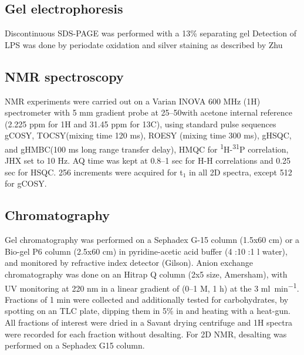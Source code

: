 	\subsection{Gel electrophoresis} %
	\label{sub:gel_electrophoresis}

		Discontinuous \ac{SDS-PAGE} was performed with a 13\% separating gel Detection of \ac{LPS} was done by periodate oxidation and silver staining as described by Zhu \etal{}

	\subsection{\textsc{NMR} spectroscopy} %
	\label{sub:nmr_spectroscopy}

		\ac{NMR} experiments were carried out on a Varian INOVA 600 \si{\mega\hertz} (1H) spectrometer with 5 \si{\milli\meter} gradient probe at 25--50\cel with acetone internal reference (2.225 ppm for 1H and 31.45 ppm for 13C), using standard pulse sequences \ac{gCOSY}, \ac{TOCSY}(mixing time 120 \si{\milli\second}), \ac{ROESY} (mixing time 300 \si{\milli\second}),  \ac{gHSQC}, and  \ac{gHMBC}(100 \si{\milli\second} long range transfer delay), \ac{HMQC} for \textsuperscript{1}H-\textsuperscript{31}P correlation, JHX set to 10 \si{\hertz}. AQ time was kept at 0.8--1 sec for H-H correlations and 0.25 sec for \ac{HSQC}. 256 increments were acquired for t$_1$ in all 2D spectra, except 512 for \ac{gCOSY}.

	\subsection{Chromatography} %
	\label{sub:chromatography}

		Gel chromatography was performed on a Sephadex G-15 column (1.5x60 cm) or a Bio-gel P6 column (2.5x60 cm) in pyridine-acetic acid buffer (4 \millilitre:10 \millilitre:1 \si{\litre} water), and monitored by refractive index detector (Gilson). Anion exchange chromatography was done on an Hitrap Q column (2x5 \millilitre size, Amersham), with \ac{UV} monitoring at 220 nm in a linear gradient of  (0--1 M, 1 h) at the 3 \si{\milli\litre\per\minute}. Fractions of 1 min were collected and additionally tested for carbohydrates, by spotting on an  \ac{TLC} plate, dipping them in 5\%  in  and heating with a heat-gun. All fractions of interest were dried in a Savant drying centrifuge and 1H spectra were recorded for each fraction without desalting. For 2D \ac{NMR}, desalting was performed on a Sephadex G15 column. 

